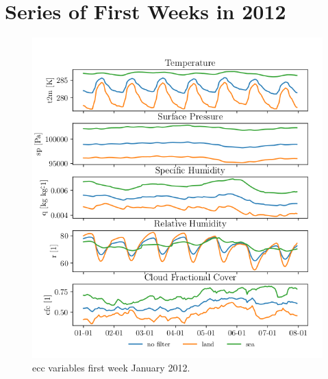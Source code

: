 \chapter{Series of First Weeks in 2012} \label{app:first_week}
\begin{figure}[ht]
    \centering
    \includegraphics{python_figs/spatially_averaged_one_week_from_2012-01-01.png}
    \caption{\acrshort{ecc} variables first week January 2012.}
    \label{fig:jan12}
\end{figure}
